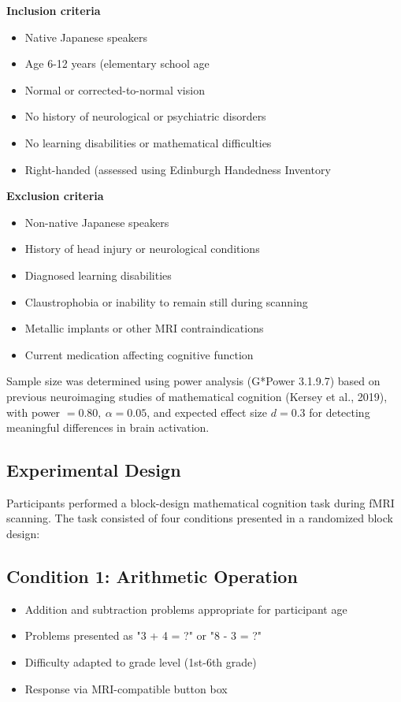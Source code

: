 \documentclass[12pt, a4paper]{article}
\begin{document}
\vspace{0.5\baselineskip}
\noindent
\textbf{Inclusion criteria}
\indent
\begin{itemize}
\item Native Japanese speakers 
\item Age 6-12 years (elementary school age 
\item Normal or corrected-to-normal vision 
\item No history of neurological or psychiatric disorders 
\item No learning disabilities or mathematical difficulties 
\item Right-handed (assessed using Edinburgh Handedness Inventory 
\end{itemize}
\noindent
\textbf{Exclusion criteria}
\indent
\begin{itemize}
\item Non-native Japanese speakers 
\item History of head injury or neurological conditions 
\item Diagnosed learning disabilities 
\item Claustrophobia or inability to remain still during scanning 
\item Metallic implants or other MRI contraindications 
\item Current medication affecting cognitive function 
\end{itemize}

Sample size was determined using power analysis (G*Power 3.1.9.7) based on previous neuroimaging studies of mathematical cognition (Kersey et al., 2019), with power $= 0.80,~\alpha = 0.05$, and expected effect size $d = 0.3$ for detecting meaningful differences in brain activation.



\subsection{Experimental Design}
Participants performed a block-design mathematical cognition task during fMRI scanning. The task consisted of four conditions presented in a randomized block design:

\subsection*{Condition 1: Arithmetic Operation}
\begin{itemize}
\item Addition and subtraction problems appropriate for participant age
\item Problems presented as "3 + 4 = ?" or "8 - 3 = ?"
\item Difficulty adapted to grade level (1st-6th grade)
\item Response via MRI-compatible button box
\end{itemize}
\end{document}
